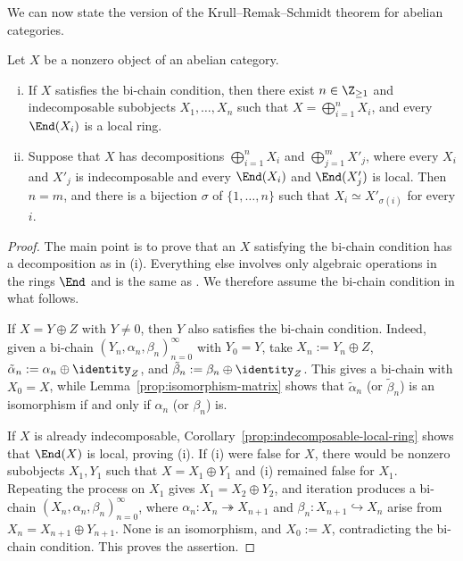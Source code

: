 We can now state the version of the Krull--Remak--Schmidt theorem for abelian
categories.
\begin{theorem}[M.\ Atiyah]\label{prop:Krull-Schmidt-gen}
	Let $X$ be a nonzero object of an abelian category.
	\begin{enumerate}[(i)]
		\item If $X$ satisfies the bi-chain condition, then there exist
		$n\in\Z_{\geq1}$ and indecomposable subobjects $X_1,\ldots,X_n$ such
		that $X=\bigoplus_{i=1}^nX_i$, and every $\End(X_i)$ is a local ring.
		\item Suppose that $X$ has decompositions $\bigoplus_{i=1}^nX_i$ and
		$\bigoplus_{j=1}^mX'_j$, where every $X_i$ and $X'_j$ is
		indecomposable and every $\End(X_i)$ and $\End(X'_j)$ is local. Then
		$n=m$, and there is a bijection $\sigma$ of $\{1,\ldots,n\}$ such that
		$X_i\simeq X'_{\sigma(i)}$ for every $i$.
	\end{enumerate}
\end{theorem}
\begin{proof}
	The main point is to prove that an $X$ satisfying the bi-chain condition
	has a decomposition as in (i). Everything else involves only algebraic
	operations in the rings $\End$ and is the same as
	\cite[Theorem 6.12.8]{Li1}. We therefore assume the bi-chain condition in
	what follows.

	If $X=Y\oplus Z$ with $Y\neq0$, then $Y$ also satisfies the bi-chain
	condition. Indeed, given a bi-chain
	$(Y_n,\alpha_n,\beta_n)_{n=0}^\infty$ with $Y_0=Y$, take
	$X_n:=Y_n\oplus Z$, $\tilde{\alpha}_n:=\alpha_n\oplus\identity_Z$, and
	$\tilde{\beta}_n:=\beta_n\oplus\identity_Z$. This gives a bi-chain with
	$X_0=X$, while Lemma~\ref{prop:isomorphism-matrix} shows that
	$\tilde{\alpha}_n$ (or $\tilde{\beta}_n$) is an isomorphism if and only if
	$\alpha_n$ (or $\beta_n$) is.

	If $X$ is already indecomposable,
	Corollary~\ref{prop:indecomposable-local-ring} shows that $\End(X)$ is
	local, proving (i). If (i) were false for $X$, there would be nonzero
	subobjects $X_1,Y_1$ such that $X=X_1\oplus Y_1$ and (i) remained false
	for $X_1$. Repeating the process on $X_1$ gives
	$X_1=X_2\oplus Y_2$, and iteration
	produces a bi-chain $(X_n,\alpha_n,\beta_n)_{n=0}^\infty$, where
	$\alpha_n:X_n\twoheadrightarrow X_{n+1}$ and
	$\beta_n:X_{n+1}\hookrightarrow X_n$ arise from
	$X_n=X_{n+1}\oplus Y_{n+1}$. None is an isomorphism, and $X_0:=X$,
	contradicting the bi-chain condition. This proves the assertion.
\end{proof}

